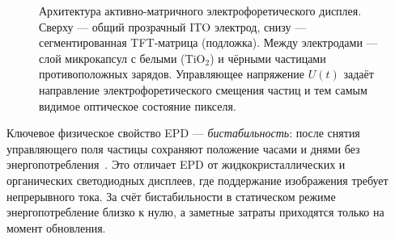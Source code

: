 \begin{figure}[H]
    \centering
    \caption{Архитектура активно-матричного электрофоретического дисплея.
        Сверху --- общий прозрачный ITO электрод, снизу --- сегментированная
        TFT-матрица (подложка). Между электродами --- слой микрокапсул с
        белыми (TiO$_2$) и чёрными частицами противоположных зарядов.
        Управляющее напряжение $U(t)$ задаёт направление электрофоретического
        смещения частиц и тем самым видимое оптическое состояние пикселя.}
    \label{fig:02_am_epd_arch}
\end{figure}
\FloatBarrier

Ключевое физическое свойство EPD --- \emph{бистабильность}: после снятия
управляющего поля частицы сохраняют положение часами и днями без
энергопотребления~\cite{yang2021_mechanisms}. Это отличает EPD от
жидкокристаллических и органических светодиодных дисплеев, где поддержание
изображения требует непрерывного тока. За счёт бистабильности в статическом режиме
энергопотребление близко к нулю, а заметные затраты приходятся только на момент
обновления.

